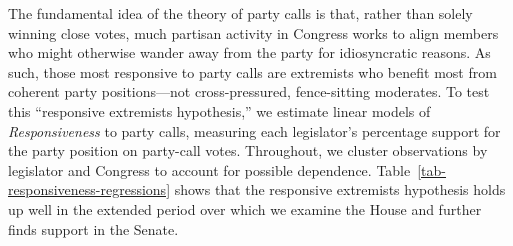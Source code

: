 \documentclass[12pt]{article}
\begin{document}
The fundamental idea of the theory of party calls is that, rather than solely winning close votes, much partisan activity in Congress works to align members who might otherwise wander away from the party for idiosyncratic reasons.  As such, those most responsive to party calls are extremists who benefit most from coherent party positions---not cross-pressured, fence-sitting moderates.  To test this ``responsive extremists hypothesis,'' we estimate linear models of \textit{Responsiveness} to party calls, measuring each legislator's percentage support for the party position on party-call votes.  Throughout, we cluster observations by legislator and Congress to account for possible dependence.  Table~\ref{tab-responsiveness-regressions} shows that the responsive extremists hypothesis holds up well in the extended period over which we examine the House and further finds support in the Senate.
\end{document}
